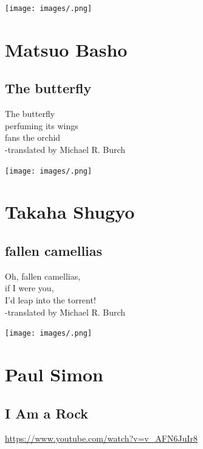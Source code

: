 \documentclass[
]{book}
\renewenvironment{quote}{\begin{VF}}{\end{VF}}
\begin{document}
\texttt{[image: images/.png]}

\hypertarget{matsuo-basho}{%
\chapter{Matsuo Basho}\label{matsuo-basho}}

\hypertarget{the-butterfly}{%
\section{The butterfly}\label{the-butterfly}}

\begin{quote}
The butterfly\\
perfuming its wings\\
fans the orchid\\
-translated by Michael R. Burch
\end{quote}

\texttt{[image: images/.png]}

\hypertarget{takaha-shugyo}{%
\chapter{Takaha Shugyo}\label{takaha-shugyo}}

\hypertarget{fallen-camellias}{%
\section{fallen camellias}\label{fallen-camellias}}

\begin{quote}
Oh, fallen camellias,\\
if I were you,\\
I'd leap into the torrent!\\
-translated by Michael R. Burch
\end{quote}

\texttt{[image: images/.png]}

\hypertarget{paul-simon}{%
\chapter{Paul Simon}\label{paul-simon}}

\hypertarget{i-am-a-rock}{%
\section{I Am a Rock}\label{i-am-a-rock}}

\url{https://www.youtube.com/watch?v=v_AFN6JuIr8}
\end{document}
